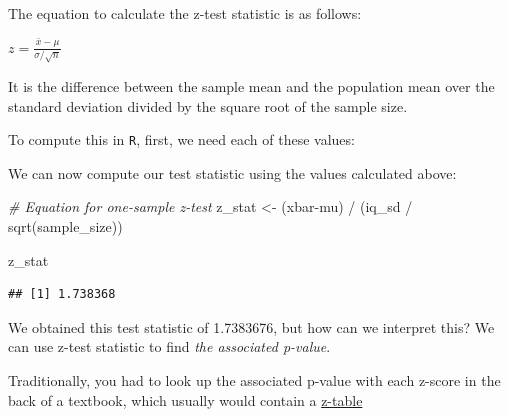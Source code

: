 \documentclass[
]{book}
\newenvironment{Shaded}{\begin{snugshade}}{\end{snugshade}}
\newcommand{\CommentTok}[1]{\textcolor[rgb]{0.56,0.35,0.01}{\textit{#1}}}
\newcommand{\DecValTok}[1]{\textcolor[rgb]{0.00,0.00,0.81}{#1}}
\newcommand{\FunctionTok}[1]{\textcolor[rgb]{0.00,0.00,0.00}{#1}}
\newcommand{\NormalTok}[1]{#1}
\newcommand{\OtherTok}[1]{\textcolor[rgb]{0.56,0.35,0.01}{#1}}
\newcommand{\SpecialCharTok}[1]{\textcolor[rgb]{0.00,0.00,0.00}{#1}}
\begin{document}
The equation to calculate the z-test statistic is as follows:

\(z = \frac{\bar{x}-\mu}{\sigma/\sqrt{n}}\)

It is the difference between the sample mean and the population mean over the standard deviation divided by the square root of the sample size.

To compute this in \texttt{R}, first, we need each of these values:

\begin{Shaded}
\end{Shaded}

We can now compute our test statistic using the values calculated above:

\begin{Shaded}
\begin{Highlighting}[]
\CommentTok{\# Equation for one{-}sample z{-}test}
\NormalTok{z\_stat }\OtherTok{\textless{}{-}}\NormalTok{ (xbar}\SpecialCharTok{{-}}\NormalTok{mu) }\SpecialCharTok{/}\NormalTok{ (iq\_sd }\SpecialCharTok{/} \FunctionTok{sqrt}\NormalTok{(sample\_size)) }

\NormalTok{z\_stat}
\end{Highlighting}
\end{Shaded}

\begin{verbatim}
## [1] 1.738368
\end{verbatim}

We obtained this test statistic of 1.7383676, but how can we interpret this? We can use z-test statistic to find \emph{the associated p-value}.

Traditionally, you had to look up the associated p-value with each z-score in the back of a textbook, which usually would contain a \href{https://www.math.arizona.edu/~rsims/ma464/standardnormaltable.pdf}{z-table}
\end{document}
